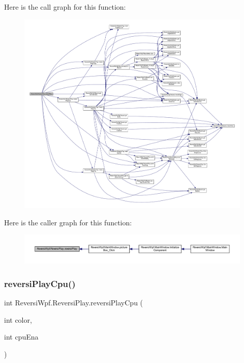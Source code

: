 Here is the call graph for this function\+:\nopagebreak
\begin{figure}[H]
\begin{center}
\leavevmode
\includegraphics[width=350pt]{class_reversi_wpf_1_1_reversi_play_a735fd2b6a5f7be5089f702f5265cd183_cgraph}
\end{center}
\end{figure}
Here is the caller graph for this function\+:\nopagebreak
\begin{figure}[H]
\begin{center}
\leavevmode
\includegraphics[width=350pt]{class_reversi_wpf_1_1_reversi_play_a735fd2b6a5f7be5089f702f5265cd183_icgraph}
\end{center}
\end{figure}
\mbox{\label{class_reversi_wpf_1_1_reversi_play_ab9824cdb1bc61ac894ea237b732bd166}} 
\subsubsection{\texorpdfstring{reversi\+Play\+Cpu()}{reversiPlayCpu()}}
{\footnotesize\ttfamily int Reversi\+Wpf.\+Reversi\+Play.\+reversi\+Play\+Cpu (\begin{DoxyParamCaption}\item[{int}]{color,  }\item[{int}]{cpu\+Ena }\end{DoxyParamCaption})}



